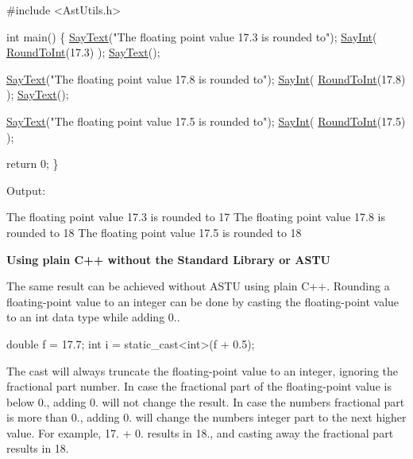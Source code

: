 \begin{DoxyCode}
\textcolor{preprocessor}{#include <AstUtils.h>}

\textcolor{keywordtype}{int} main()
\{
  \hyperlink{group__io__group_ga82cdf45375c3b92b2a60c3d9b55d682f}{SayText}(\textcolor{stringliteral}{"The floating point value 17.3 is rounded to"});
  \hyperlink{group__io__group_gaa78da65e44d9ab5e70c79ed77f62b86a}{SayInt}( \hyperlink{group__math__group_ga06bd02ff0de83d2713683574ac288fb3}{RoundToInt}(17.3) );
  \hyperlink{group__io__group_ga82cdf45375c3b92b2a60c3d9b55d682f}{SayText}();

  \hyperlink{group__io__group_ga82cdf45375c3b92b2a60c3d9b55d682f}{SayText}(\textcolor{stringliteral}{"The floating point value 17.8 is rounded to"});
  \hyperlink{group__io__group_gaa78da65e44d9ab5e70c79ed77f62b86a}{SayInt}( \hyperlink{group__math__group_ga06bd02ff0de83d2713683574ac288fb3}{RoundToInt}(17.8) );
  \hyperlink{group__io__group_ga82cdf45375c3b92b2a60c3d9b55d682f}{SayText}();

  \hyperlink{group__io__group_ga82cdf45375c3b92b2a60c3d9b55d682f}{SayText}(\textcolor{stringliteral}{"The floating point value 17.5 is rounded to"});
  \hyperlink{group__io__group_gaa78da65e44d9ab5e70c79ed77f62b86a}{SayInt}( \hyperlink{group__math__group_ga06bd02ff0de83d2713683574ac288fb3}{RoundToInt}(17.5) );

  \textcolor{keywordflow}{return} 0;
\}
\end{DoxyCode}


Output\+: 
\begin{DoxyCode}
The floating point value 17.3 is rounded to
17
The floating point value 17.8 is rounded to
18
The floating point value 17.5 is rounded to
18
\end{DoxyCode}
 {\bfseries Using plain C++ without the Standard Library or A\+S\+TU}

The same result can be achieved without A\+S\+TU using plain C++. Rounding a floating-\/point value to an integer can be done by casting the floating-\/point value to an int data type while adding 0..


\begin{DoxyCode}
\textcolor{keywordtype}{double} f = 17.7;
\textcolor{keywordtype}{int} i = \textcolor{keyword}{static\_cast<}\textcolor{keywordtype}{int}\textcolor{keyword}{>}(f + 0.5);
\end{DoxyCode}


The cast will always truncate the floating-\/point value to an integer, ignoring the fractional part number. In case the fractional part of the floating-\/point value is below 0., adding 0. will not change the result. In case the number\textquotesingle{}s fractional part is more than 0., adding 0. will change the number\textquotesingle{}s integer part to the next higher value. For example, 17. + 0. results in 18., and casting away the fractional part results in 18. \mbox{\label{group__math__group_ga8c8748fbb1d3e99db79f20fc17d4e63b}} 
